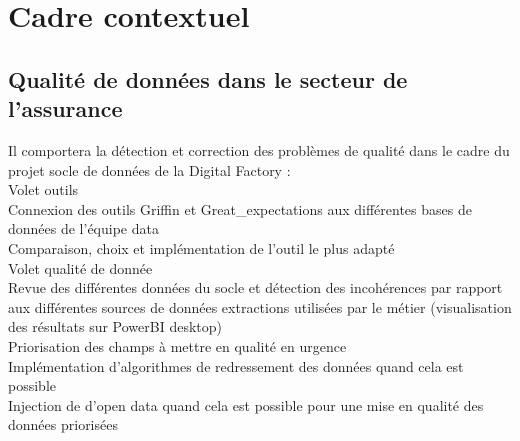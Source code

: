 \documentclass[12pt,a4paper]{article}
\author{Aurel ATTERE}
\begin{document}
\section{Cadre contextuel}
\subsection{Qualité de données dans le secteur de l'assurance }
Il comportera la détection et correction des problèmes de qualité dans le cadre du projet socle de données de la Digital Factory  :\\
	
Volet outils\\
Connexion des outils Griffin et Great\_expectations aux différentes bases de données de l'équipe data\\
Comparaison, choix et implémentation de l'outil le plus adapté\\	

Volet qualité de donnée\\
Revue des différentes données du socle et détection des incohérences par rapport aux différentes sources de données \/ extractions utilisées par le métier (visualisation des résultats sur PowerBI desktop)\\
Priorisation des champs à mettre en qualité en urgence\\
Implémentation d'algorithmes de redressement des données quand cela est possible \\
Injection de d'open data quand cela est possible pour une mise en qualité des données priorisées
\end{document}

